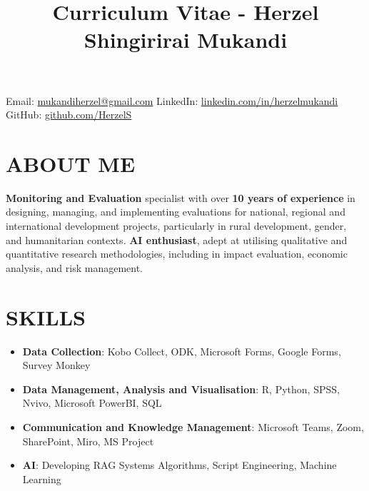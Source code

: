 \documentclass[
  10pt,
]{article}
\title{Curriculum Vitae - Herzel Shingirirai Mukandi}
\author{}
\date{\vspace{-2.5em}}
\begin{document}
\maketitle

\vspace{-2em}

\begin{center}
{\small
Email: \textcolor{blue}{\href{mailto:mukandiherzel@gmail.com}{mukandiherzel@gmail.com}} \quad
LinkedIn: \textcolor{blue}{\href{https://www.linkedin.com/in/herzelmukandi}{linkedin.com/in/herzelmukandi}} \quad
GitHub: \textcolor{blue}{\href{https://github.com/HerzelS}{github.com/HerzelS}}
}
\end{center}

\vspace{0.5em}

\section{ABOUT ME}\label{about-me}

\textbf{Monitoring and Evaluation} specialist with over \textbf{10 years
of experience} in designing, managing, and implementing evaluations for
national, regional and international development projects, particularly in rural development, gender, and humanitarian contexts. \textbf{AI enthusiast}, adept at utilising qualitative and quantitative research methodologies, including in
impact evaluation, economic analysis, and risk management.

\vspace{0.5cm}

\section{SKILLS}\label{skills}

\begin{itemize}
\item
  \textbf{Data Collection}: Kobo Collect, ODK, Microsoft Forms, Google
  Forms, Survey Monkey
\item
  \textbf{Data Management, Analysis and Visualisation}: R, Python, SPSS,
  Nvivo, Microsoft PowerBI, SQL
\item
  \textbf{Communication and Knowledge Management}: Microsoft Teams,
  Zoom, SharePoint, Miro, MS Project
\item
  \textbf{AI}: Developing RAG Systems Algorithms, Script Engineering, Machine Learning
\end{itemize}
\end{document}
